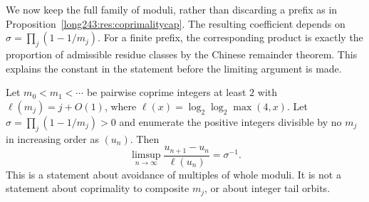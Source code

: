 We now keep the full family of moduli, rather than discarding a prefix
as in Proposition~\ref{long243:res:coprimalitycap}. The resulting
coefficient depends on $\sigma=\prod_j(1-1/m_j)$. For a finite prefix,
the corresponding product is exactly the proportion of admissible
residue classes by the Chinese remainder theorem. This explains the
constant in the statement before the limiting argument is made.

\begin{theorem}\label{long243:res:gapconstant}
Let $m_0<m_1<\cdots$ be pairwise coprime integers at least $2$ with
$\ell(m_j)=j+O(1)$, where $\ell(x)=\log_2\log_2\max(4,x)$.
Let $\sigma=\prod_j(1-1/m_j)>0$ and enumerate the positive integers
divisible by no $m_j$ in increasing order as $(u_n)$. Then
\[
 \limsup_{n\to\infty}\frac{u_{n+1}-u_n}{\ell(u_n)}=\sigma^{-1}.
\]
This is a statement about avoidance of multiples of whole moduli. It is not a statement
about coprimality to composite $m_j$, or about integer tail orbits.
\end{theorem}

